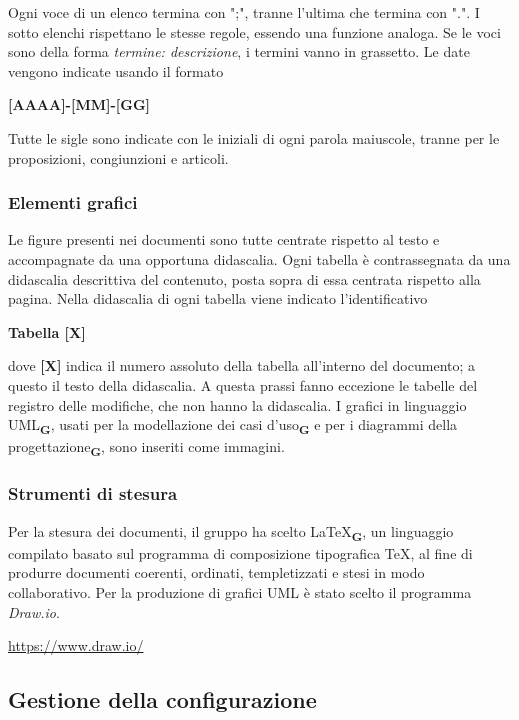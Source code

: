 Ogni voce di un elenco termina con ";", tranne l'ultima che termina con ".". I sotto elenchi rispettano le stesse regole, essendo una funzione analoga. Se le voci sono della forma \textit{termine: descrizione}, i termini vanno in grassetto.
Le date vengono indicate usando il formato
\begin{center}
    \textbf{[AAAA]-[MM]-[GG]}
\end{center}
Tutte le sigle sono indicate con le iniziali di ogni parola maiuscole, tranne per le proposizioni, congiunzioni e articoli.
\subsubsection{Elementi grafici}
Le figure presenti nei documenti sono tutte centrate rispetto al testo e accompagnate da una opportuna didascalia.
Ogni tabella è contrassegnata da una didascalia descrittiva del contenuto, posta sopra di essa centrata rispetto alla pagina.  Nella didascalia di ogni tabella viene indicato l'identificativo
\begin{center}
    \textbf{Tabella [X]}
\end{center}
dove \textbf{[X]} indica il numero assoluto della tabella all'interno del documento; a questo il testo della didascalia. A questa prassi fanno eccezione le tabelle del registro delle modifiche, che non hanno la didascalia.
I grafici in linguaggio UML\textsubscript{\textbf{G}}, usati per la modellazione dei casi d'uso\textsubscript{\textbf{G}} e per i diagrammi della progettazione\textsubscript{\textbf{G}}, sono inseriti come immagini.
\subsubsection{Strumenti di stesura}
\subsubsubsection{\LaTeX}
Per la stesura dei documenti, il gruppo ha scelto \LaTeX\textsubscript{\textbf{G}}, un linguaggio compilato basato sul programma di composizione tipografica \TeX, al fine di produrre documenti coerenti, ordinati, templetizzati e stesi in modo collaborativo.
Per la produzione di grafici UML è stato scelto il programma \textit{Draw.io}.
\begin{center}
    \href{https://www.draw.io/}{https://www.draw.io/}\\
\end{center}
\subsection{Gestione della configurazione}
